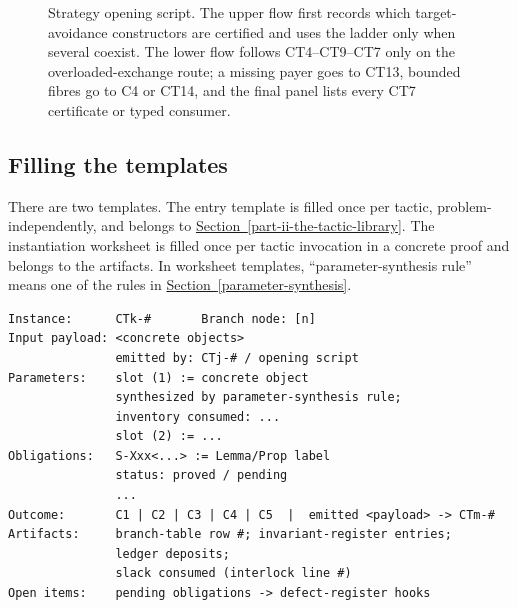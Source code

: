 \documentclass[
  11pt,
]{article}
\theoremstyle{definition}
\newcommand{\secref}[1]{\hyperref[#1]{Section~\ref*{#1}}}
\begin{document}
\begin{figure}[htbp]
{%
}
\caption[Strategy opening script]{Strategy opening script.  The upper flow first records which target-avoidance constructors are certified and uses the ladder only when several coexist.  The lower flow follows CT4--CT9--CT7 only on the overloaded-exchange route; a missing payer goes to CT13, bounded fibres go to C4 or CT14, and the final panel lists every CT7 certificate or typed consumer.}
\label{fig:strategy-opening-script}
\end{figure}

\subsection{Filling the templates}\label{filling-the-templates}

There are two templates. The entry template is filled once per tactic,
problem-independently, and belongs to \secref{part-ii-the-tactic-library}. The instantiation
worksheet is filled once per tactic invocation in a concrete proof and
belongs to the artifacts.
In worksheet templates, ``parameter-synthesis rule'' means one of the
rules in \secref{parameter-synthesis}.

\begingroup
\small
\begin{verbatim}
Instance:      CTk-#       Branch node: [n]
Input payload: <concrete objects>
               emitted by: CTj-# / opening script
Parameters:    slot (1) := concrete object
               synthesized by parameter-synthesis rule;
               inventory consumed: ...
               slot (2) := ...
Obligations:   S-Xxx<...> := Lemma/Prop label
               status: proved / pending
               ...
Outcome:       C1 | C2 | C3 | C4 | C5  |  emitted <payload> -> CTm-#
Artifacts:     branch-table row #; invariant-register entries;
               ledger deposits;
               slack consumed (interlock line #)
Open items:    pending obligations -> defect-register hooks
\end{verbatim}
\endgroup
\end{document}
